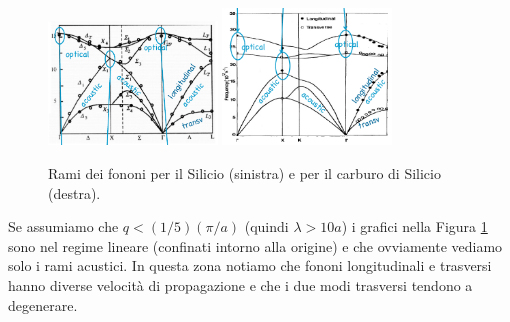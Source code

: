\begin{figure}[H]
    \centering
    \includegraphics[width=0.4\textwidth]{figures/Si-rami.png}
    \includegraphics[width=0.4\textwidth]{figures/SiC-rami.png}
    \caption{Rami dei fononi per il Silicio (sinistra) e per il carburo di Silicio (destra).}
    \label{fig:figures-SiC-rami-png}
\end{figure}
Se assumiamo che $q<(1/5)(\pi /a)$ (quindi $\lambda >10a$) i grafici nella Figura \ref{fig:figures-SiC-rami-png} sono nel regime lineare (confinati intorno alla origine) e che ovviamente vediamo solo i rami acustici. In questa zona notiamo che fononi longitudinali e trasversi hanno diverse velocità di propagazione e che i due modi trasversi tendono a degenerare. 
